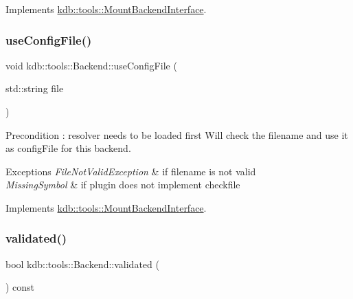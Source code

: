 Implements \mbox{\hyperlink{classkdb_1_1tools_1_1MountBackendInterface}{kdb\+::tools\+::\+Mount\+Backend\+Interface}}.

\mbox{\label{classkdb_1_1tools_1_1Backend_a5c72747e5419d7802849cfc2eb4064d2}} 
\subsubsection{\texorpdfstring{useConfigFile()}{useConfigFile()}}
{\footnotesize\ttfamily void kdb\+::tools\+::\+Backend\+::use\+Config\+File (\begin{DoxyParamCaption}\item[{std\+::string}]{file }\end{DoxyParamCaption})\hspace{0.3cm}{\ttfamily [virtual]}}

\begin{DoxyPrecond}{Precondition}
\+: resolver needs to be loaded first Will check the filename and use it as config\+File for this backend. 
\end{DoxyPrecond}

\begin{DoxyExceptions}{Exceptions}
{\em File\+Not\+Valid\+Exception} & if filename is not valid \\
\hline
{\em Missing\+Symbol} & if plugin does not implement \textquotesingle{}checkfile\textquotesingle{} \\
\hline
\end{DoxyExceptions}


Implements \mbox{\hyperlink{classkdb_1_1tools_1_1MountBackendInterface}{kdb\+::tools\+::\+Mount\+Backend\+Interface}}.

\mbox{\label{classkdb_1_1tools_1_1Backend_a7b28929231bc592c1a83f42121405496}} 
\subsubsection{\texorpdfstring{validated()}{validated()}}
{\footnotesize\ttfamily bool kdb\+::tools\+::\+Backend\+::validated (\begin{DoxyParamCaption}{ }\end{DoxyParamCaption}) const\hspace{0.3cm}{\ttfamily [virtual]}}

